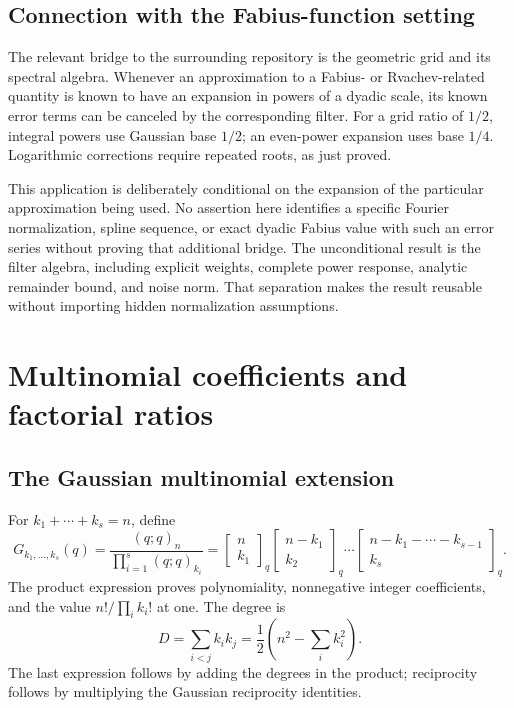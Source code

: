 \documentclass[11pt,a4paper,oneside,openany]{book}
\theoremstyle{definition}
\theoremstyle{remark}
\newcommand{\GB}[3][q]{\begin{bmatrix}#2\\#3\end{bmatrix}_{#1}}
\begin{document}
\section{Connection with the Fabius-function setting}
The relevant bridge to the surrounding repository is the geometric grid and its
spectral algebra. Whenever an approximation to a Fabius- or Rvachev-related
quantity is known to have an expansion in powers of a dyadic scale, its known
error terms can be canceled by the corresponding filter. For a grid ratio of
\(1/2\), integral powers use Gaussian base \(1/2\); an even-power
expansion uses base \(1/4\). Logarithmic corrections require repeated roots,
as just proved.

This application is deliberately conditional on the expansion of the particular
approximation being used. No assertion here identifies a specific Fourier
normalization, spline sequence, or exact dyadic Fabius value with such an error
series without proving that additional bridge. The unconditional result is the
filter algebra, including explicit weights, complete power response, analytic
remainder bound, and noise norm. That separation makes the result reusable
without importing hidden normalization assumptions.

\chapter{Multinomial coefficients and factorial ratios}
\label{qcc:factorial-ratios}
\section{The Gaussian multinomial extension}
For \(k_1+\cdots+k_s=n\), define
\[
 G_{k_1,\ldots,k_s}(q)
  =\frac{(q;q)_n}{\prod_{i=1}^{s}(q;q)_{k_i}}
  =\GB n{k_1}\GB{n-k_1}{k_2}\cdots
                  \GB{n-k_1-\cdots-k_{s-1}}{k_s}.
\]
The product expression proves polynomiality, nonnegative integer coefficients,
and the value \(n!/\prod_i k_i!\) at one. The degree is
\[
 D=\sum_{i<j}k_ik_j=\frac12\left(n^2-\sum_i k_i^2\right).
\]
The last expression follows by adding the degrees in the product; reciprocity
follows by multiplying the Gaussian reciprocity identities.
\end{document}

